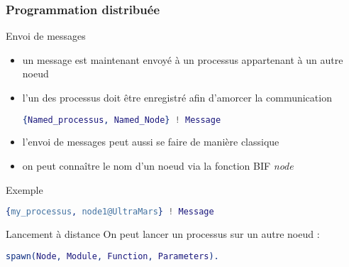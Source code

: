 \begin{frame}[fragile]
  \frametitle{Programmation distribuée}

  \begin{block}{Envoi de messages}
    \begin{itemize}
    \item un message est maintenant envoyé à un processus appartenant à un
      autre noeud
    \item l'un des processus doit être enregistré afin d'amorcer la
      communication
      \begin{lstlisting}[language=erlang]
{Named_processus, Named_Node} ! Message
      \end{lstlisting}
    \item l'envoi de messages peut aussi se faire de manière classique
    \item on peut connaître le nom d'un noeud via la fonction BIF \textit{node}
    \end{itemize}
  \end{block}

  \begin{exampleblock}{Exemple}
    \begin{lstlisting}[language=erlang]
{my_processus, node1@UltraMars} ! Message
    \end{lstlisting}
  \end{exampleblock}

  \begin{alertblock}{Lancement à distance}
    On peut lancer un processus sur un autre noeud :
    \begin{lstlisting}[language=erlang]
spawn(Node, Module, Function, Parameters).
    \end{lstlisting}
  \end{alertblock}

\end{frame}

